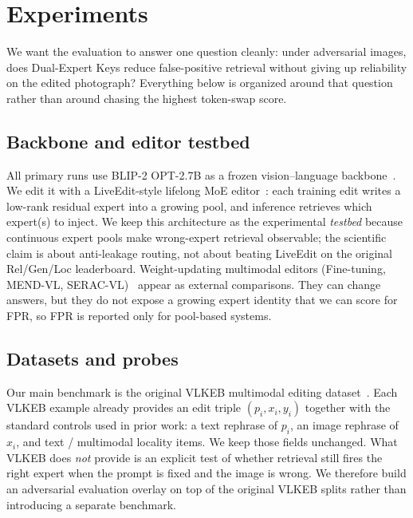 \documentclass[letterpaper]{article} %
\begin{document}
\section{Experiments}
\label{sec:experiments}

We want the evaluation to answer one question cleanly: under adversarial images, does Dual-Expert Keys reduce false-positive retrieval without giving up reliability on the edited photograph?
Everything below is organized around that question rather than around chasing the highest token-swap score.

\subsection{Backbone and editor testbed}
All primary runs use BLIP-2 OPT-2.7B as a frozen vision--language backbone~\cite{li2023blip2}.
We edit it with a LiveEdit-style lifelong MoE editor~\cite{chen2025liveedit}: each training edit writes a low-rank residual expert into a growing pool, and inference retrieves which expert(s) to inject.
We keep this architecture as the experimental \emph{testbed} because continuous expert pools make wrong-expert retrieval observable; the scientific claim is about anti-leakage routing, not about beating LiveEdit on the original Rel/Gen/Loc leaderboard.
Weight-updating multimodal editors (Fine-tuning, MEND-VL, SERAC-VL)~\cite{mitchell2022mend,mitchell2022serac,cheng2023mmedit} appear as external comparisons.
They can change answers, but they do not expose a growing expert identity that we can score for FPR, so FPR is reported only for pool-based systems.

\subsection{Datasets and probes}
\label{sec:data-prep}
Our main benchmark is the original VLKEB multimodal editing dataset~\cite{huang2024vlkeb}.
Each VLKEB example already provides an edit triple $(p_i,x_i,y_i)$ together with the standard controls used in prior work: a text rephrase of $p_i$, an image rephrase of $x_i$, and text / multimodal locality items.
We keep those fields unchanged.
What VLKEB does \emph{not} provide is an explicit test of whether retrieval still fires the right expert when the prompt is fixed and the image is wrong.
We therefore build an adversarial evaluation overlay on top of the original VLKEB splits rather than introducing a separate benchmark.
\end{document}
